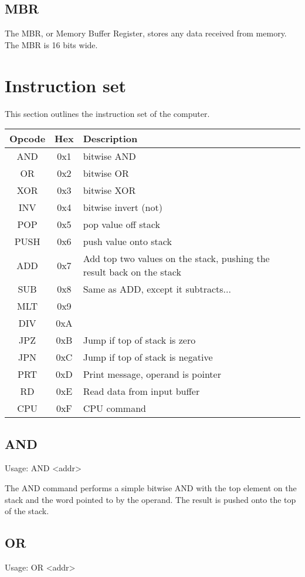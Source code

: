 \documentclass{book}
\begin{document}
\subsection{MBR}
  The MBR, or Memory Buffer Register, stores any data received from memory. The MBR is 16 bits
  wide.

\section{Instruction set}
This section outlines the instruction set of the computer. \\
\begin{tabular}{|c|c|l|}
  \hline
  \textbf{Opcode} & \textbf{Hex} & \textbf{Description} \\
  \hline
  AND & 0x1 & bitwise AND \\
  OR & 0x2 & bitwise OR \\
  XOR & 0x3 & bitwise XOR \\
  INV & 0x4 & bitwise invert (not) \\
  POP & 0x5 & pop value off stack \\
  PUSH & 0x6 & push value onto stack \\
  ADD & 0x7 & Add top two values on the stack, pushing the result back on the stack \\
  SUB & 0x8 & Same as ADD, except it subtracts... \\
  MLT & 0x9 & \\
  DIV & 0xA & \\
  JPZ & 0xB & Jump if top of stack is zero \\
  JPN & 0xC & Jump if top of stack is negative \\
  PRT & 0xD & Print message, operand is pointer \\
  RD  & 0xE & Read data from input buffer \\
  CPU & 0xF & CPU command \\
  \hline
\end{tabular}

\subsection{AND}
  Usage: AND \textless addr\textgreater 

  The AND command performs a simple bitwise AND with the top element on the stack and
  the word pointed to by the operand. The result is pushed onto the top of the stack.

\subsection{OR}
  Usage: OR \textless addr\textgreater 
\end{document}
